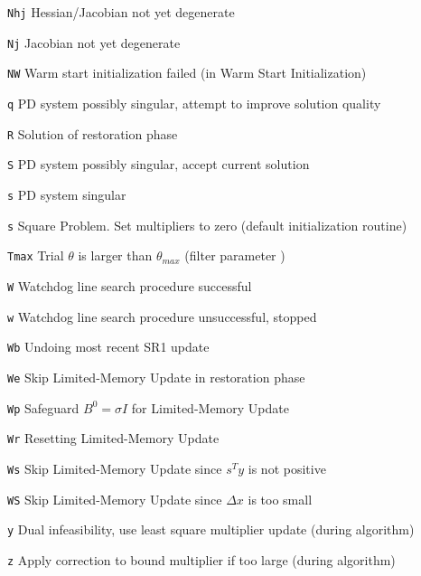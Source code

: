 \begin{list}{blub}{\itemsep0pt}
 \item[\texttt{Nhj}] Hessian/Jacobian not yet degenerate \cite[Sec.~3.1]{WaBi2006}
 \item[\texttt{Nj}] Jacobian not yet degenerate \cite[Sec.~3.1]{WaBi2006}
 \item[\texttt{NW}] Warm start initialization failed (in Warm Start Initialization)
 \item[\texttt{q}] PD system possibly singular, attempt to improve solution quality \cite[Sec.~3.1]{WaBi2006}
 \item[\texttt{R}] Solution of restoration phase \cite[Sec.~3.3]{WaBi2006}
 \item[\texttt{S}] PD system possibly singular, accept current solution \cite[Sec.~3.1]{WaBi2006}
 \item[\texttt{s}] PD system singular \cite[Sec.~3.1]{WaBi2006}
 \item[\texttt{s}] Square Problem. Set multipliers to zero (default initialization routine)
 \item[\texttt{Tmax}] Trial $\theta$ is larger than $\theta_{max}$ (filter parameter \cite[Eq.~(21)]{WaBi2006})
 \item[\texttt{W}] Watchdog line search procedure successful \cite[Sec.~3.2]{WaBi2006}
 \item[\texttt{w}] Watchdog line search procedure unsuccessful, stopped \cite[Sec.~3.2]{WaBi2006}
 \item[\texttt{Wb}] Undoing most recent SR1 update \cite[Sec.~5.4.1]{Biegler2010}
 \item[\texttt{We}] Skip Limited-Memory Update in restoration phase  \cite[Sec.~5.4.1]{Biegler2010}
 \item[\texttt{Wp}] Safeguard $B^0 = \sigma I$ for  Limited-Memory Update \cite[Sec.~5.4.1]{Biegler2010}
 \item[\texttt{Wr}] Resetting Limited-Memory Update \cite[Sec.~5.4.1]{Biegler2010}
 \item[\texttt{Ws}] Skip Limited-Memory Update since $s^Ty$ is not positive \cite[Sec.~5.4.1]{Biegler2010}
 \item[\texttt{WS}] Skip Limited-Memory Update since $\Delta x$ is too small \cite[Sec.~5.4.1]{Biegler2010}
 \item[\texttt{y}] Dual infeasibility, use least square multiplier update (during \IPOPT algorithm)
 \item[\texttt{z}] Apply correction to bound multiplier if too large (during \IPOPT algorithm)
\end{list}

